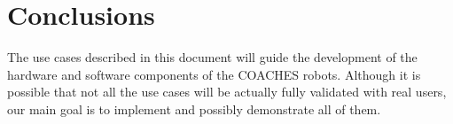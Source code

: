 \section{Conclusions}

The use cases described in this document will guide the development of the hardware and software components of the COACHES robots. Although it is possible that not all the use cases will be actually fully validated with real users, our main goal is to implement and possibly demonstrate all of them.


